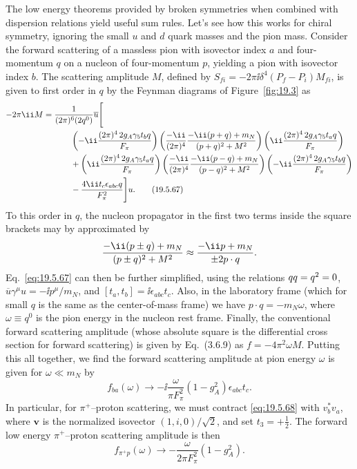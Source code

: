 The low energy theorems provided by broken symmetries when combined with dispersion relations yield useful sum rules. Let's see how this works for chiral symmetry, ignoring the small $u$ and $d$ quark masses and the pion mass. Consider the forward scattering of a massless pion with isovector index $a$ and four-momentum $q$ on a nucleon of four-momentum $p$, yielding a pion with isovector index $b$. The scattering amplitude $M$, defined by $S_{fi}=-2\pi \ii\delta^4(P_f-P_i)M_{fi}$, is given to first order in $q$ by the Feynman diagrams of Figure~\ref{fig:19.3} as
\begin{align}
-2\pi \ii M
={}&\frac{1}{(2\pi)^6(2q^0)}
\overline u\Bigg[
\notag\\
&\qquad
\left(-\ii\frac{(2\pi)^4\,2g_A\gamma_5t_b\sl{q}}{F_\pi}\right)
\left(\frac{-\ii}{(2\pi)^4}
\frac{-\ii(\sl{p}+\sl{q})+m_N}{(p+q)^2+M^2}\right)
\left(\ii\frac{(2\pi)^4\,2g_A\gamma_5t_a\sl{q}}{F_\pi}\right)
\notag\\
&\qquad+
\left(\ii\frac{(2\pi)^4\,2g_A\gamma_5t_a\sl{q}}{F_\pi}\right)
\left(\frac{-\ii}{(2\pi)^4}
\frac{-\ii(\sl{p}-\sl{q})+m_N}{(p-q)^2+M^2}\right)
\left(-\ii\frac{(2\pi)^4\,2g_A\gamma_5t_b\sl{q}}{F_\pi}\right)
\notag\\
&\qquad-\frac{4\ii t_c\epsilon_{abc}\sl{q}}{F_\pi^2}
\Bigg]u.
\tag{19.5.67}\label{eq:19.5.67}
\end{align}
To this order in $q$, the nucleon propagator in the first two terms inside the square brackets may by approximated by
\[
\frac{-\ii(\sl{p}\mathbin{\pm}\sl{q})+m_N}
{(p\mathbin{\pm}q)^2+M^2}
\approx
\frac{-\ii\sl{p}+m_N}{\mathbin{\pm}2p\cdot q}.
\]
Eq.~\eqref{eq:19.5.67} can then be further simplified, using the relations $\sl{q}\sl{q}=q^2=0$, $\overline u\gamma^\mu u=-\ii p^\mu/m_N$, and $[t_a,t_b]=\ii\epsilon_{abc}t_c$. Also, in the laboratory frame (which for small $q$ is the same as the center-of-mass frame) we have $p\cdot q=-m_N\omega$, where $\omega\equiv q^0$ is the pion energy in the nucleon rest frame. Finally, the conventional forward scattering amplitude (whose absolute square is the differential cross section for forward scattering) is given by Eq.~(3.6.9) as $f=-4\pi^2\omega M$. Putting this all together, we find the forward scattering amplitude at pion energy $\omega$ is given for $\omega\ll m_N$ by
\begin{equation}
f_{ba}(\omega)
\longrightarrow
-\ii\frac{\omega}{\pi F_\pi^2}(1-g_A^2)\epsilon_{abc}t_c.
\tag{19.5.68}\label{eq:19.5.68}
\end{equation}
In particular, for $\pi^+$--proton scattering, we must contract \eqref{eq:19.5.68} with $v_b^*v_a$, where $\boldsymbol v$ is the normalized isovector $(1,i,0)/\sqrt{2}$, and set $t_3=+\tfrac12$. The forward low energy $\pi^+$--proton scattering amplitude is then
\begin{equation}
f_{\pi^+p}(\omega)
\longrightarrow
-\frac{\omega}{2\pi F_\pi^2}(1-g_A^2).
\tag{19.5.69}\label{eq:19.5.69}
\end{equation}

